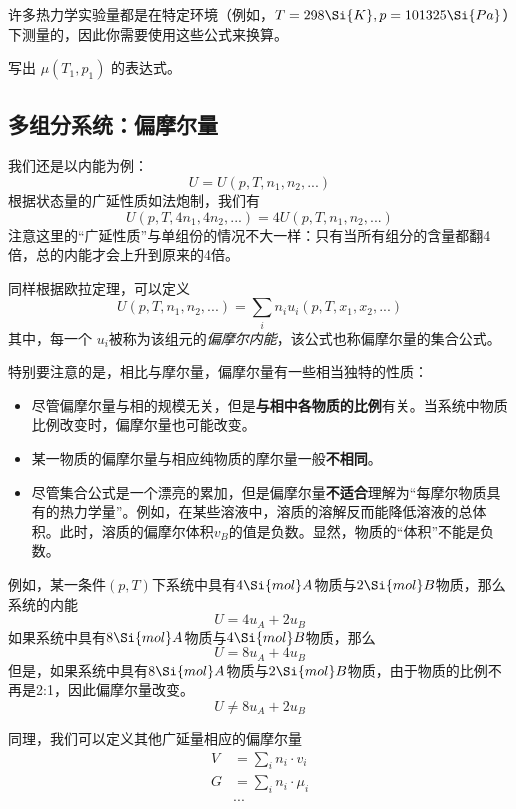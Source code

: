 许多热力学实验量都是在特定环境（例如，$T = 298 \Si{K}, p = 101325\Si{Pa}$）下测量的，因此你需要使用这些公式来换算。

\begin{exercise}{}
写出 $\mu(T_1,p_1)$ 的表达式。
\end{exercise}

\subsection{多组分系统：偏摩尔量}
我们还是以内能为例：
$$U = U (p, T, n_1, n_2, ...)$$
根据状态量的广延性质如法炮制，我们有
$$ U (p, T, 4n_1, 4n_2, ...) = 4U (p, T, n_1, n_2, ...)$$
注意这里的“广延性质”与单组份的情况不大一样：只有当所有组分的含量都翻4倍，总的内能才会上升到原来的4倍。

同样根据欧拉定理，可以定义
$$ U (p, T, n_1, n_2, ...) = \sum_i n_i u_i(p, T, x_1, x_2, ...) $$
其中，每一个 $u_i$被称为该组元的\textsl{偏摩尔内能}，该公式也称偏摩尔量的集合公式。

特别要注意的是，相比与摩尔量，偏摩尔量有一些相当独特的性质：
\begin{itemize}
\item 尽管偏摩尔量与相的规模无关，但是\textbf{与相中各物质的比例}有关。当系统中物质比例改变时，偏摩尔量也可能改变。
\item 某一物质的偏摩尔量与相应纯物质的摩尔量一般\textbf{不相同}。
\item 尽管集合公式是一个漂亮的累加，但是偏摩尔量\textbf{不适合}理解为“每摩尔物质具有的热力学量”。例如，在某些溶液中，溶质的溶解反而能降低溶液的总体积。此时，溶质的偏摩尔体积$v_B$的值是负数。显然，物质的“体积”不能是负数。
\end{itemize}

\begin{example}{}
例如，某一条件$(p,T)$下系统中具有$4 \Si{mol} A$物质与$2 \Si{mol} B$物质，那么系统的内能
$$U = 4 u_{A} +  2 u_B $$
如果系统中具有$8 \Si{mol} A$物质与$4 \Si{mol} B$物质，那么
$$U = 8 u_A +  4 u_B$$
但是，如果系统中具有$8 \Si{mol} A$物质与$2 \Si{mol} B$物质，由于物质的比例不再是2:1，因此偏摩尔量改变。
$$U \ne 8 u_A +  2 u_B$$
\end{example}

同理，我们可以定义其他广延量相应的偏摩尔量
$$
\begin{aligned}
V &= \sum_i  n_i \cdot v_i \\
G &= \sum_i  n_i \cdot \mu_i \\
&...\\
\end{aligned}
$$

